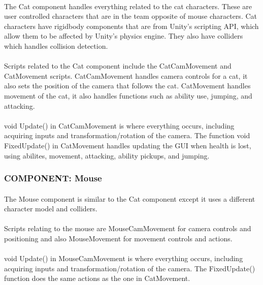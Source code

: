 \documentclass[12pt, titlepage]{article}
\begin{document}
\paragraph{} The Cat component handles everything related to the cat characters. These are user controlled characters that are in the team opposite of mouse characters. Cat characters have rigidbody components that are from Unity's scripting API, which allow them to be affected by Unity's physics engine. They also have colliders which handles collision detection.
\paragraph{} Scripts related to the Cat component include the CatCamMovement and CatMovement scripts. CatCamMovement handles camera controls for a cat, it also sets the position of the camera that follows the cat. CatMovement handles movement of the cat, it also handles functions such as ability use, jumping, and attacking.
\paragraph{} void Update() in CatCamMovement is where everything occurs, including acquiring inputs and transformation/rotation of the camera. The function void FixedUpdate() in CatMovement handles updating the GUI when health is lost, using abilites, movement, attacking, ability pickups, and jumping.
\subsubsection{COMPONENT: Mouse}
\paragraph{} The Mouse component is similar to the Cat component except it uses a different character model and colliders.
\paragraph{}Scripts relating to the mouse are MouseCamMovement for camera controls and positioning and also MouseMovement for movement controls and actions.
\paragraph{} void Update() in MouseCamMovement is where everything occurs, including acquiring inputs and transformation/rotation of the camera. The FixedUpdate() function does the same actions as the one in CatMovement.
\end{document}
